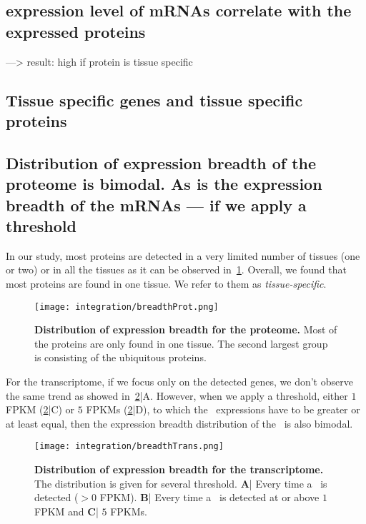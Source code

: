 
\subsection{expression level of mRNAs correlate with the expressed proteins}

---> result: high if protein is tissue specific

\subsection{Tissue specific genes and tissue specific proteins}

\subsection{Distribution of expression breadth of the proteome is bimodal. As is
the expression breadth of the mRNAs --- if we apply a threshold}
\label{subsec:IntegrationProteinBimodalExpre}

In our study, most proteins are detected in a very limited number of tissues (one
or two) or in all the tissues as it can be observed in~\cref{fig:breadthProt}.
Overall, we found that most proteins are found in one tissue. We refer to them as
\emph{tissue-specific}.

\begin{figure}
    \texttt{[image: integration/breadthProt.png]}\centering
    \caption[Distribution of expression breadth for the proteome]
    {\label{fig:breadthProt}\textbf{Distribution of expression breadth for the
    proteome.} Most of the proteins are only found in one tissue. The second
    largest group is consisting of the ubiquitous proteins.}
\end{figure}


For the transcriptome, if we focus only on the detected genes, we don’t observe
the same trend as showed in~\cref{fig:breadthTrans}|A.
However, when we apply a threshold, either $1$ \gls{FPKM}
(\cref{fig:breadthTrans}|C) or
$5$ \glspl{FPKM} (\cref{fig:breadthTrans}|D), to which the \mRNA\ expressions
have to be
greater or at least equal, then the expression breadth distribution of the \mRNAs\
is also bimodal.

\begin{figure}
    \texttt{[image: integration/breadthTrans.png]}\centering
    \caption[Distribution of expression breadth for the transcriptome]
    {\label{fig:breadthTrans}\textbf{Distribution of expression breadth for the
    transcriptome.} The distribution is given for several threshold.
    \textbf{A}| Every time a \mRNA\ is detected ($> 0$ \gls{FPKM}).
    \textbf{B}| Every time a \mRNA\ is detected at or above $1$ \gls{FPKM} and
    \textbf{C}| $5$ \glspl{FPKM}.}
\end{figure}


